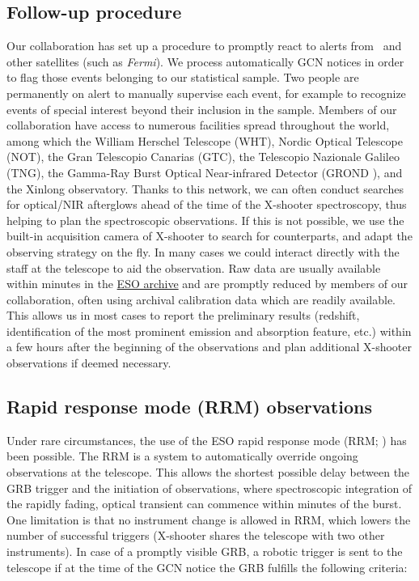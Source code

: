 \documentclass[longauth]{aa}    %
\begin{document}
\subsection{Follow-up procedure}

Our collaboration has set up a procedure to promptly react to alerts from
\swift~and other satellites (such as \textit{Fermi}). We process automatically
GCN notices in order to flag those events belonging to our statistical sample.
Two people are permanently on alert to manually supervise each event, for
example to recognize events of special interest beyond their inclusion in the
sample. Members of our collaboration have access to numerous facilities spread
throughout the world, among which the William Herschel Telescope (WHT), Nordic
Optical Telescope (NOT), the Gran Telescopio Canarias (GTC), the Telescopio
Nazionale Galileo (TNG), the Gamma-Ray Burst Optical Near-infrared Detector
(GROND \citealt{Greiner2008}), and the Xinlong observatory. Thanks to this
network, we can often conduct searches for optical/NIR afterglows ahead of the
time of the X-shooter spectroscopy, thus helping to plan the spectroscopic
observations. If this is not possible, we use the built-in acquisition camera of
X-shooter to search for counterparts, and adapt the observing strategy on the
fly. In many cases we could interact directly with the staff at the telescope to
aid the observation. Raw data are usually available within minutes in the
\href{http://archive.eso.org/wdb/wdb/eso/xshooter/form}{ESO archive} and are
promptly reduced by members of our collaboration, often using archival
calibration data which are readily available. This allows us in most cases to
report the preliminary results (redshift, identification of the most prominent
emission and absorption feature, etc.) within a few hours after the beginning of
the observations and plan additional X-shooter observations if deemed necessary.

\subsection{Rapid response mode (RRM) observations} \label{RRM}

Under rare circumstances, the use of the ESO rapid response mode (RRM;
\citealt{Vreeswijk2010}) has been possible. The RRM is a system to automatically
override ongoing observations at the telescope. This allows the shortest
possible delay between the GRB trigger and the initiation of observations, where
spectroscopic integration of the rapidly fading, optical transient can commence
within minutes of the burst. One limitation is that no instrument change is
allowed in RRM, which lowers the number of successful triggers (X-shooter shares the telescope with two other instruments). In case of a promptly visible GRB, a robotic
trigger is sent to the telescope if at the time of the GCN notice the GRB
fulfills the following criteria:
\end{document}
